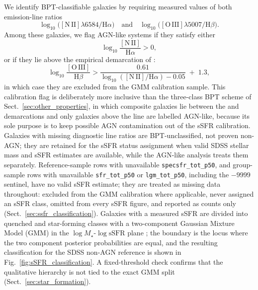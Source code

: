 \documentclass{aa}
\begin{document}
\begin{appendix}
We identify BPT-classifiable galaxies by requiring measured values of both emission-line ratios
\[
\log_{10}\bigl([\mathrm{N\,II}]\lambda6584/\mathrm{H}\alpha\bigr)
\quad\text{and}\quad
\log_{10}\bigl([\mathrm{O\,III}]\lambda5007/\mathrm{H}\beta\bigr).
\]
Among these galaxies, we flag AGN-like systems if they satisfy either
\[
\log_{10}\frac{[\mathrm{N\,II}]}{\mathrm{H}\alpha} > 0,
\]
or if they lie above the empirical demarcation of \citet{Kauffmann+03a}:
\[
\log_{10}\frac{[\mathrm{O\,III}]}{\mathrm{H}\beta}
> \frac{0.61}{\log_{10}([\mathrm{N\,II}]/\mathrm{H}\alpha)-0.05} \;+\; 1.3,
\]
in which case they are excluded from the GMM calibration sample. This calibration flag is deliberately more inclusive than the three-class BPT scheme of Sect.~\ref{sec:other_properties}, in which composite galaxies lie between the \citet{Kauffmann+03a} and \citet{Kewley+01} demarcations and only galaxies above the \citet{Kewley+01} line are labelled AGN-like, because its sole purpose is to keep possible AGN contamination out of the sSFR calibration. Galaxies with missing diagnostic line ratios are BPT-unclassified, not proven non-AGN; they are retained for the sSFR status assignment when valid SDSS stellar mass and sSFR estimates are available, while the AGN-like analysis treats them separately.
Reference-sample rows with unavailable \texttt{specsfr\_tot\_p50}, and group-sample rows with unavailable \texttt{sfr\_tot\_p50} or \texttt{lgm\_tot\_p50}, including the \(-9999\) sentinel, have no valid sSFR estimate; they are treated as missing data throughout: excluded from the GMM calibration where applicable, never assigned an sSFR class, omitted from every sSFR figure, and reported as counts only (Sect.~\ref{sec:ssfr_classification}).
Galaxies with a measured sSFR are divided into quenched and star-forming classes with a two-component Gaussian Mixture Model (GMM) in the \(\log M_\star\)-\(\log\mathrm{sSFR}\) plane \citep{McLachlanPeel2000}; the boundary is the locus where the two component posterior probabilities are equal, and the resulting classification for the SDSS non-AGN reference is shown in Fig.~\ref{fig:sSFR_classification}. A fixed-threshold check confirms that the qualitative hierarchy is not tied to the exact GMM split (Sect.~\ref{sec:star_formation}).


\end{appendix}
\end{document}
